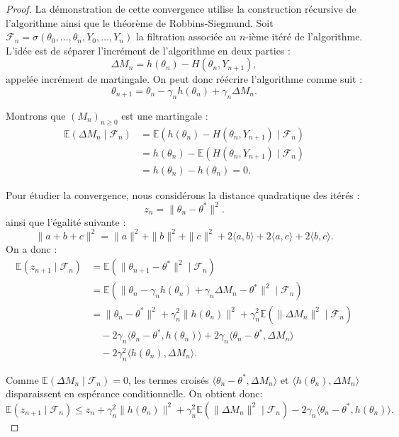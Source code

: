\begin{proof}
    La démonstration de cette convergence utilise la construction récursive de l'algorithme ainsi que le théorème de Robbins-Siegmund.
    Soit $\mathcal{F}_n = \sigma(\theta_0, \dots, \theta_n, Y_0, \dots, Y_n)$ la filtration associée au $n$-ième itéré de l'algorithme.
    L'idée est de séparer l'incrément de l'algorithme en deux parties :
    \[
    \Delta M_n = h(\theta_n) - H(\theta_n, Y_{n+1}),
    \]
    appelée incrément de martingale. On peut donc réécrire l'algorithme comme suit :
    \[
    \theta_{n+1} = \theta_n - \gamma_n h(\theta_n) + \gamma_n \Delta M_n.
    \]

    Montrons que $(M_n)_{n \geq 0}$ est une martingale :
    \[
    \begin{aligned}
        \mathbb{E}(\Delta M_n \mid \mathcal{F}_n) &= \mathbb{E}(h(\theta_n) - H(\theta_n, Y_{n+1}) \mid \mathcal{F}_n) \\
        &= h(\theta_n) - \mathbb{E}(H(\theta_n, Y_{n+1}) \mid \mathcal{F}_n) \\
        &= h(\theta_n) - h(\theta_n) = 0.
    \end{aligned}
    \]

    Pour étudier la convergence, nous considérons la distance quadratique des itérés :
    \[
    z_n = \|\theta_n - \theta^*\|^2.
    \]
    ainsi que l'égalité suivante : 
        $$ \| a + b + c \|^2 = \|a\|^2 + \|b\|^2 + \|c\|^2 + 2 \langle a,b \rangle + 2 \langle a, c \rangle + 2 \langle b , c \rangle. $$
    On a donc : 
        \[
            \begin{aligned}
                \mathbb{E}(z_{n+1} \mid \mathcal{F}_n) &= \mathbb{E}(\|\theta_{n+1} - \theta^*\|^2 \mid \mathcal{F}_n) \\
                &= \mathbb{E}(\|\theta_n - \gamma_n h(\theta_n) + \gamma_n \Delta M_n - \theta^*\|^2 \mid \mathcal{F}_n) \\
                &= \|\theta_n - \theta^*\|^2 + \gamma_n^2 \|h(\theta_n)\|^2 + \gamma_n^2 \mathbb{E}(\|\Delta M_n\|^2 \mid \mathcal{F}_n) \\
                &\quad - 2\gamma_n \langle \theta_n - \theta^*, h(\theta_n) \rangle + 2\gamma_n \langle \theta_n - \theta^*, \Delta M_n \rangle \\
                &\quad - 2\gamma_n^2 \langle h(\theta_n), \Delta M_n \rangle.
            \end{aligned}
        \]

    Comme $\mathbb{E}(\Delta M_n \mid \mathcal{F}_n) = 0$, les termes croisés $\langle \theta_n - \theta^*, \Delta M_n \rangle$ et $\langle h(\theta_n), \Delta M_n \rangle$ disparaissent en espérance conditionnelle. On obtient donc:
    \[
        \mathbb{E}(z_{n+1} \mid \mathcal{F}_n) \leqslant z_n + \gamma_n^2 \|h(\theta_n)\|^2 + \gamma_n^2 \mathbb{E}(\|\Delta M_n\|^2 \mid \mathcal{F}_n) - 2\gamma_n \langle \theta_n - \theta^*, h(\theta_n) \rangle.
    \]


\end{proof}

